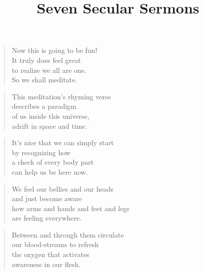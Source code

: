 \documentclass[10pt,a4paper]{article}
\begin{document}
\begin{titlepage}
\title{Seven Secular Sermons}
\date{}
\maketitle
%    
\end{titlepage}

\tableofcontents
\pagebreak

\begin{multicols}{2}


\begin{verse}
Now this is going to be fun!\\
It truly does feel great\\
to realize we all are one.\\
So we shall meditate.
\end{verse}

\begin{verse}
This meditation’s rhyming verse\\
describes a paradigm\\
of us inside this universe,\\
adrift in space and time.
\end{verse}

\begin{verse}
It’s nice that we can simply start\\
by recognizing how\\
a check of every body part\\
can help us be here now.
\end{verse}

\begin{verse}
We feel our bellies and our heads\\
and just become aware\\
how arms and hands and feet and legs\\
are feeling everywhere.
\end{verse}

\begin{verse}
Between and through them circulate\\
our blood-streams to refresh\\
the oxygen that activates\\
awareness in our flesh.
\end{verse}


\end{multicols}
\end{document}
